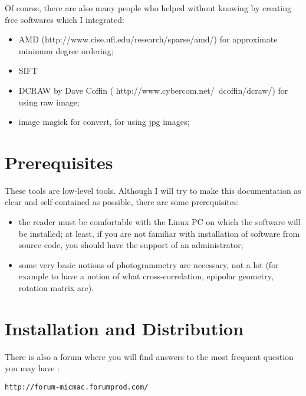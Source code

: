 Of course, there are also many people who helped without knowing by creating
free softwares which I integrated:


\begin{itemize}
   \item    AMD  (http://www.cise.ufl.edu/research/sparse/amd/) for approximate minimum degree ordering;
   \item    SIFT
   \item    DCRAW by Dave Coffin ( http://www.cybercom.net/~dcoffin/dcraw/) for using raw image;
   \item    image magick for convert, for using jpg images;
\end{itemize}


\section{Prerequisites}

These tools are low-level tools. Although I will try to make this
documentation as clear and self-contained as possible, there are some
prerequisites:

\begin{itemize}
   \item the reader must be comfortable with the Linux PC on which the software
         will be installed; at least, if you are not familiar with installation
         of software from source code, you should have the support of 
         an administrator;

   \item some very basic notions of photogrammetry are necessary, not a lot
         (for example to have a notion of what cross-correlation,
         epipolar geometry, rotation matrix are).
\end{itemize}


\section{Installation and Distribution}

There is also a forum where you will find answers to the most frequent question 
you may have :

\begin{verbatim}
http://forum-micmac.forumprod.com/
\end{verbatim}



